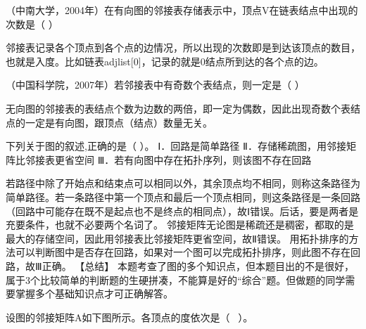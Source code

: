 \question （中南大学，2004年）在有向图的邻接表存储表示中，顶点V在链表结点中出现的次数是（
）
\par{}
\begin{solution}邻接表记录各个顶点到各个点的边情况，所以出现的次数即是到达该顶点的数目，也就是入度。比如链表adjlist{[}0{]}，记录的就是0结点所到达的各个点的边。
\end{solution}
\question （中国科学院，2007年）若邻接表中有奇数个表结点，则一定是（ ）
\par{}
\begin{solution}无向图的邻接表的表结点个数为边数的两倍，即一定为偶数，因此出现奇数个表结点的一定是有向图，跟顶点（结点）数量无关。
\end{solution}
\question 下列关于图的叙述,正确的是（ ）。 Ⅰ．回路是简单路径
Ⅱ．存储稀疏图，用邻接矩阵比邻接表更省空间
Ⅲ．若有向图中存在拓扑序列，则该图不存在回路
\par{}
\begin{solution}若路径中除了开始点和结束点可以相同以外，其余顶点均不相同，则称这条路径为简单路径。若一条路径中第一个顶点和最后一个顶点相同，则这条路径是一条回路（回路中可能存在既不是起点也不是终点的相同点），故Ⅰ错误。后话，要是两者是充要条件，也就不必要两个名词了。
邻接矩阵无论图是稀疏还是稠密，都取的是最大的存储空间，因此用邻接表比邻接矩阵更省空间，故Ⅱ错误。
用拓扑排序的方法可以判断图中是否存在回路，如果对一个图可以完成拓扑排序，则此图不存在回路，故Ⅲ正确。
【总结】
本题考查了图的多个知识点，但本题目出的不是很好，属于3个比较简单的判断题的生硬拼凑，不能算是好的``综合''题。但做题的同学需要掌握多个基础知识点才可正确解答。
\end{solution}
\question 设图的邻接矩阵A如下图所示。各顶点的度依次是（ ~）。~

